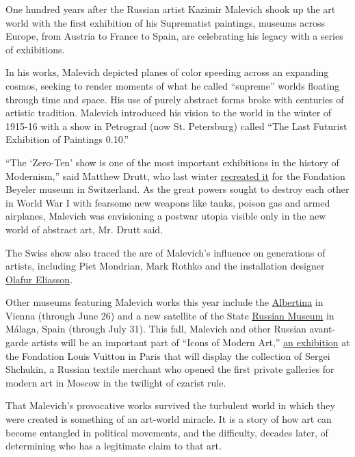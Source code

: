 One hundred years after the Russian artist Kazimir Malevich shook up the
art world with the first exhibition of his Suprematist paintings,
museums across Europe, from Austria to France to Spain, are celebrating
his legacy with a series of exhibitions.

In his works, Malevich depicted planes of color speeding across an
expanding cosmos, seeking to render moments of what he called
``supreme'' worlds floating through time and space. His use of purely
abstract forms broke with centuries of artistic tradition. Malevich
introduced his vision to the world in the winter of 1915-16 with a show
in Petrograd (now St. Petersburg) called ``The Last Futurist Exhibition
of Paintings 0.10.''

``The `Zero-Ten' show is one of the most important exhibitions in the
history of Modernism,'' said Matthew Drutt, who last winter
\href{http://www.fondationbeyeler.ch/en/exhibitions/search-010}{recreated
it} for the Fondation Beyeler museum in Switzerland. As the great powers
sought to destroy each other in World War I with fearsome new weapons
like tanks, poison gas and armed airplanes, Malevich was envisioning a
postwar utopia visible only in the new world of abstract art, Mr. Drutt
said.

The Swiss show also traced the arc of Malevich's influence on
generations of artists, including Piet Mondrian, Mark Rothko and the
installation designer \href{http://www.olafureliasson.net/}{Olafur
Eliasson}.

Other museums featuring Malevich works this year include the
\href{http://www.albertina.at/jart/prj3/albertina/main.jart?rel=en\&reserve-mode=active\&content-id=1202307119323\&j-cc-node=item\&j-cc-id=1435222262094\&j-cc-item=ausstellungen\&ausstellungen_id=1435222262094}{Albertina}
in Vienna (through June 26) and a new satellite of the State
\href{http://en.rusmuseum.ru/exhibitions/mobile/jack-of-diamonds/}{Russian
Museum} in Málaga, Spain (through July 31). This fall, Malevich and
other Russian avant-garde artists will be an important part of ``Icons
of Modern Art,''
\href{http://www.theguardian.com/artanddesign/2016/feb/10/treasures-modern-art-seen-outside-russia-first-time-sergei-shchukin}{an
exhibition} at the Fondation Louis Vuitton in Paris that will display
the collection of Sergei Shchukin, a Russian textile merchant who opened
the first private galleries for modern art in Moscow in the twilight of
czarist rule.

That Malevich's provocative works survived the turbulent world in which
they were created is something of an art-world miracle. It is a story of
how art can become entangled in political movements, and the difficulty,
decades later, of determining who has a legitimate claim to that art.

